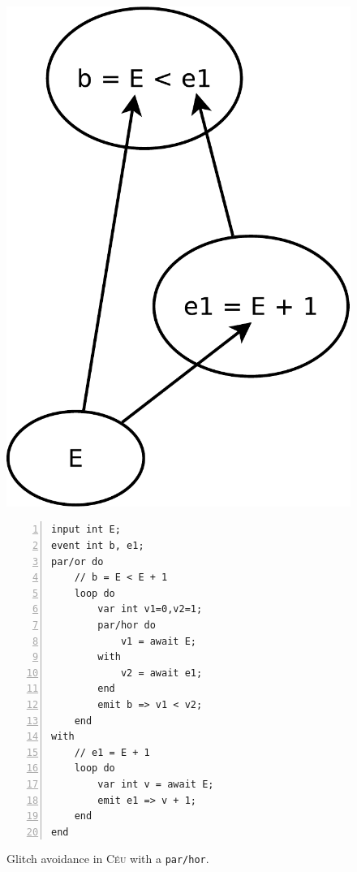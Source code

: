 \documentclass{acm_proc_article-sp}
\newcommand{\CEU}{\textsc{C\'{e}u}\xspace}
\newcommand{\code}[1] {{\small{\texttt{#1}}}}
\newcommand{\1}{\;}
\newcommand{\2}{\;\;}
\newcommand{\3}{\;\;\;}
\newcommand{\5}{\;\;\;\;\;}
\begin{document}
\begin{figure}[t]
\begin{minipage}[t]{0.34\linewidth}
\vspace{30pt}
\hspace{0.0cm}
\includegraphics[width=\textwidth]{s}
\hspace{0.0cm}
\end{minipage}
%
\begin{minipage}[t]{0.10\linewidth}
\hspace{0.4cm}
\end{minipage}
\begin{minipage}[t]{0.55\linewidth}
\begin{lstlisting}[numbers=left,xleftmargin=0em]
input int E;
event int b, e1;
par/or do
    // b = E < E + 1
    loop do
        var int v1=0,v2=1;
        par/hor do
            v1 = await E;
        with
            v2 = await e1;
        end
        emit b => v1 < v2;
    end
with
    // e1 = E + 1
    loop do
        var int v = await E;
        emit e1 => v + 1;
    end
end
\end{lstlisting}
\end{minipage}
\caption{ Glitch avoidance in \CEU with a \code{par/hor}.
\label{fig.glitch}
{\small
}
\label{lst.glitch}
}
\end{figure}
\end{document}
